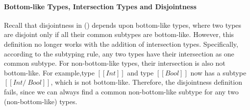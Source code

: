 
\paragraph{Bottom-like Types, Intersection Types and Disjointness}
\noindent %
Recall that disjointness in  () depends
upon bottom-like types, where two types are disjoint only if all their common
subtypes are bottom-like. However, this definition no longer works with the
addition of intersection types. Specifically, according to the subtyping rule, any two
types have their intersection as one common subtype. For
non-bottom-like types, their intersection is also not bottom-like. For
example,type $[[Int]]$ and type $[[Bool]]$ now has a subtype $[[Int /\ Bool]]$,
which is not bottom-like. Therefore, the disjointness definition fails, since we
can always find a common non-bottom-like subtype for any two (non-bottom-like)
types.

\begin{comment}
Reader may think at this point to add intersection of non-overlapping types such as $[[Int /\ Bool]]$
in bottom-like types to solve the problem. A trivial and intuitive approach to think of is:

\begin{center}
\drule[]{bl-andsub}
\end{center}

\noindent \Rref{bl-andsub} states that if two types $[[A]]$ and $[[B]]$
are not subtypes of each other (i.e. non-overlapping) then intersection of
such types $[[A /\ B]]$ is bottom-like.
\Rref{bl-andsub} works for simple cases such as $[[Int]]$ and $[[Bool]]$.
But it fails if  $[[A]]$ = $[[Int /\ Bool]]$ and 
$[[B]]$ = $[[Int /\ Bool]]$.
Because $[[A]]$ ($[[Int /\ Bool]]$) and $[[B]]$ ($[[Int /\ Bool]]$) are subtypes
of each other and are not bottom-like as per \rref{bl-andsub}.
So, naive addition of \rref{bl-andsub} skips potential bottem-like types.
Another alternative may be:

\begin{center}
\drule[]{bl-anddisj}
\end{center}

\noindent \Rref{bl-anddisj} states that if two types $[[A]]$ and $[[B]]$ are disjoint,
then intersection of such types $[[A /\ B]]$ is bottom-like.
But \rref{bl-anddisj} imposes additional complexities of mutually
dependent definitions among disjointness and bottom-like.
This makes completeness challenging or even impossible to prove.
\end{comment}
